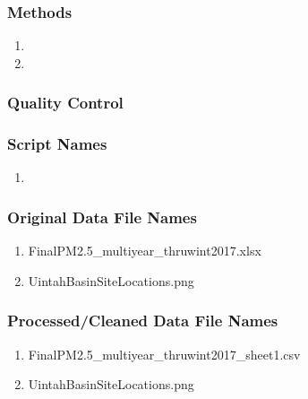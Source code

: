 \subsubsection*{Methods}

\begin{enumerate}
\item 
\item
\end{enumerate}

\subsubsection*{Quality Control}

\subsubsection*{Script Names}

\begin{enumerate}
\item 
\end{enumerate}

\subsubsection*{Original Data File Names}

\begin{enumerate}
\item FinalPM2.5\_multiyear\_thruwint2017.xlsx
\item UintahBasinSiteLocations.png
\end{enumerate}

\subsubsection*{Processed/Cleaned Data File Names}

\begin{enumerate}
\item FinalPM2.5\_multiyear\_thruwint2017\_sheet1.csv%
\item UintahBasinSiteLocations.png
\end{enumerate}